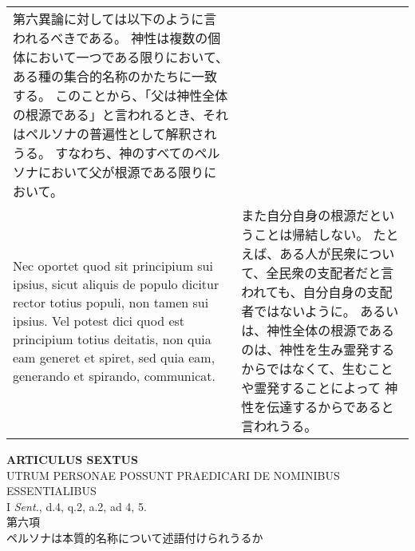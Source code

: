 \documentclass[10pt]{jsarticle} %
\begin{document}
\begin{longtable}{p{21em}p{21em}}
第六異論に対しては以下のように言われるべきである。
神性は複数の個体において一つである限りにおいて、ある種の集合的名称のかたちに一致する。
このことから、「父は神性全体の根源である」と言われるとき、それはペルソナの普遍性として解釈されうる。
すなわち、神のすべてのペルソナにおいて父が根源である限りにおいて。

\\



Nec oportet quod
sit principium sui ipsius, sicut aliquis de populo dicitur rector totius
populi, non tamen sui ipsius. Vel potest dici quod est principium totius
deitatis, non quia eam generet et spiret, sed quia eam, generando et spirando,
communicat.


&

また自分自身の根源だということは帰結しない。
たとえば、ある人が民衆について、全民衆の支配者だと言われても、自分自身の支配者ではないように。
あるいは、神性全体の根源であるのは、神性を生み霊発するからではなくて、生むことや霊発することによって
神性を伝達するからであると言われうる。
\end{longtable}
\newpage


\begin{center}
 {\Large {\bf ARTICULUS SEXTUS}}\\
 {\large UTRUM PERSONAE POSSUNT PRAEDICARI DE NOMINIBUS ESSENTIALIBUS}\\
 {\footnotesize I \textit{Sent.}, d.4, q.2, a.2, ad 4, 5.}\\
 {\Large 第六項\\ペルソナは本質的名称について述語付けられうるか}
\end{center}
\end{document}
